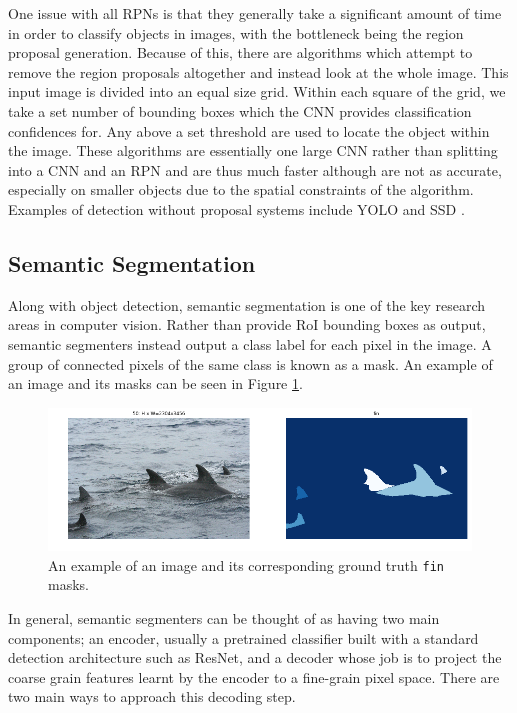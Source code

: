 One issue with all RPNs is that they generally take a significant amount of time in order to classify objects in images, with the bottleneck being the region proposal generation. Because of this, there are algorithms which attempt to remove the region proposals altogether and instead look at the whole image. This input image is divided into an equal size grid. Within each square of the grid, we take a set number of bounding boxes which the CNN provides classification confidences for. Any above a set threshold are used to locate the object within the image. These algorithms are essentially one large CNN rather than splitting into a CNN and an RPN and are thus much faster although are not as accurate, especially on smaller objects due to the spatial constraints of the algorithm. Examples of detection without proposal systems include YOLO \cite{redmon_you_2016} and SSD \cite{liu_ssd:_2016}. 

\subsection{Semantic Segmentation}\label{ch:Background,sec:semanticSegmentation}

Along with object detection, semantic segmentation is one of the key research areas in computer vision. Rather than provide RoI bounding boxes as output, semantic segmenters instead output a class label for each pixel in the image. A group of connected pixels of the same class is known as a mask. An example of an image and its masks can be seen in Figure \ref{fig:masks-example}.

\begin{figure}
	\begin{center}
		\includegraphics[scale=0.5]{Chapter2/figs/masks-example.png}
	\end{center}
	\caption{An example of an image and its corresponding ground truth \texttt{fin} masks.}
	\label{fig:masks-example}
\end{figure}

In general, semantic segmenters can be thought of as having two main components; an encoder, usually a pretrained classifier built with a standard detection architecture such as ResNet, and a decoder whose job is to project the coarse grain features learnt by the encoder to a fine-grain pixel space. There are two main ways to approach this decoding step.


